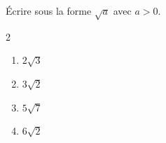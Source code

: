 \begin{exo}{}
	Écrire sous la forme $\sqrt{a}$ avec $a > 0$.
	\vspace*{-2mm}\begin{multicols}{2}
		\begin{enumerate}[itemsep=2mm]
			\item $2\sqrt{3}$
			\item $3\sqrt{2}$
			\item $5\sqrt{7}$
			\item $6\sqrt{2}$
		\end{enumerate}
	\end{multicols}
\end{exo}
